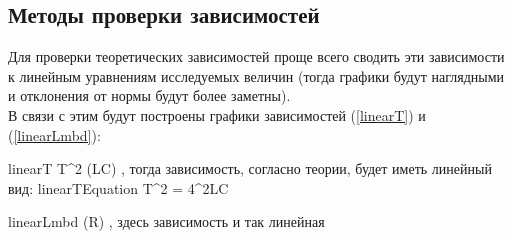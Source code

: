 \subsection {Методы проверки зависимостей}

Для проверки теоретических зависимостей проще всего сводить эти зависимости к линейным уравнениям исследуемых величин (тогда графики будут наглядными и отклонения от нормы будут более заметны). \\

\noindent В связи с этим будут построены графики зависимостей (\ref{linearT}) и (\ref{linearLmbd}):

\formula
{}
{linearT}
{T^2 (LC) \quad,}
\formula
{тогда зависимость, согласно теории, будет иметь линейный вид:}
{linearTEquation}
{T^2 = 4\pi^2LC}

\formula
{}
{linearLmbd}
{\lambda(R) \quad,}
здесь зависимость и так линейная